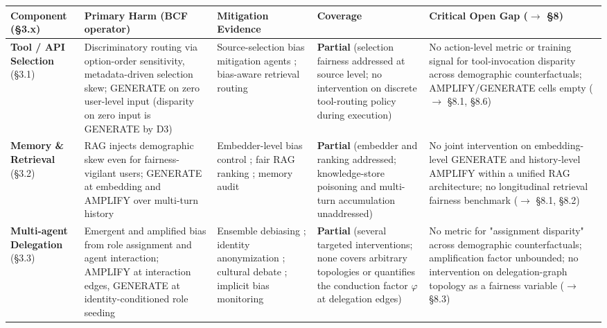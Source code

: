 \documentclass[10pt]{article}
\begin{document}
\begin{center}\footnotesize
\begin{longtable}{|p{}|p{}|p{}|p{}|p{}|}
\hline \textbf{Component (\S{}3.x)} & \textbf{Primary Harm (BCF operator)} & \textbf{Mitigation Evidence} & \textbf{Coverage} & \textbf{Critical Open Gap ($\rightarrow$ \S{}8)} \\ \hline\endhead
\textbf{Tool / API Selection} (\S{}3.1) & Discriminatory routing via option-order sensitivity, metadata-driven selection skew; GENERATE on zero user-level input (disparity on zero input is GENERATE by D3) \cite{blankenstein2025biasbusters,sneh2025tooltweak} & Source-selection bias mitigation agents \cite{singh2025bias,singh2025biasb}; bias-aware retrieval routing & \textbf{Partial} (selection fairness addressed at source level; no intervention on discrete tool-routing policy during execution) & No action-level metric or training signal for tool-invocation disparity across demographic counterfactuals; AMPLIFY/GENERATE cells empty ($\rightarrow$ \S{}8.1, \S{}8.6) \\ \hline
\textbf{Memory \& Retrieval} (\S{}3.2) & RAG injects demographic skew even for fairness-vigilant users; GENERATE at embedding and AMPLIFY over multi-turn history \cite{hu2024free,fan2024fairmt,wang2025bias} & Embedder-level bias control \cite{kim2025mitigating}; fair RAG ranking \cite{kim2024fair}; memory audit \cite{ma2026implicit} & \textbf{Partial} (embedder and ranking addressed; knowledge-store poisoning and multi-turn accumulation unaddressed) & No joint intervention on embedding-level GENERATE and history-level AMPLIFY within a unified RAG architecture; no longitudinal retrieval fairness benchmark ($\rightarrow$ \S{}8.1, \S{}8.2) \\ \hline
\textbf{Multi-agent Delegation} (\S{}3.3) & Emergent and amplified bias from role assignment and agent interaction; AMPLIFY at interaction edges, GENERATE at identity-conditioned role seeding \cite{nguyen2025social,madigan2025emergent} & Ensemble debiasing \cite{owens2024multi,xu2024mitigating}; identity anonymization \cite{choi2025identity}; cultural debate \cite{ki2025multiple}; implicit bias monitoring \cite{borah2024implicit} & \textbf{Partial} (several targeted interventions; none covers arbitrary topologies or quantifies the conduction factor $\varphi$ at delegation edges) & No metric for "assignment disparity" across demographic counterfactuals; amplification factor unbounded; no intervention on delegation-graph topology as a fairness variable ($\rightarrow$ \S{}8.3) \\ \hline

\end{longtable}
\end{center}
\end{document}
